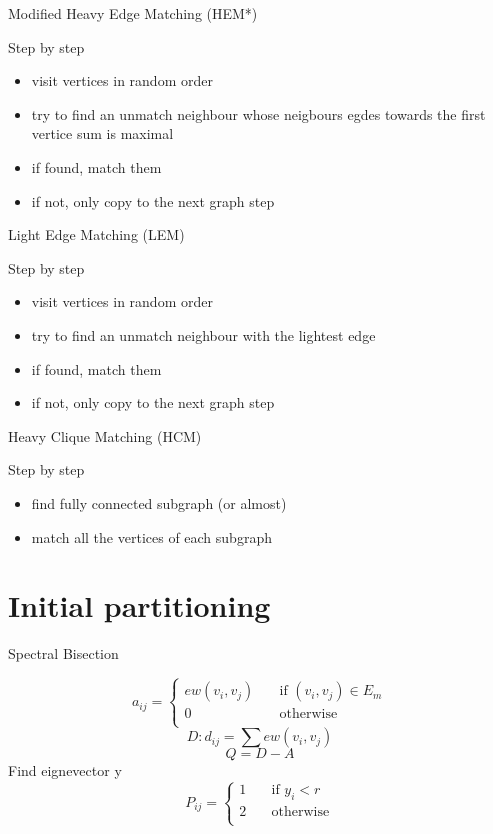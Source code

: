 \documentclass{beamer}
\begin{document}
\begin{frame}{Modified Heavy Edge Matching (HEM*)}
	\begin{block}{Step by step}
		 \begin{itemize}
			\item visit vertices in random order
			\item try to find an unmatch neighbour whose neigbours egdes towards the first vertice sum is maximal
			\item if found, match them
			\item if not, only copy to the next graph step
		 \end{itemize}
	\end{block}
\end{frame}


\begin{frame}{Light Edge Matching (LEM)}
	\begin{block}{Step by step}
		 \begin{itemize}
			\item visit vertices in random order
			\item try to find an unmatch neighbour with the lightest edge
			\item if found, match them
			\item if not, only copy to the next graph step
		 \end{itemize}
	\end{block}
\end{frame}


\begin{frame}{Heavy Clique Matching (HCM)}
	\begin{block}{Step by step}
		 \begin{itemize}
			\item find fully connected subgraph (or almost)
			\item match all the vertices of each subgraph
		 \end{itemize}
	\end{block}
\end{frame}

\section{Initial partitioning}

\begin{frame}{Spectral Bisection}

 \[a_{ij} =
  \begin{cases}
    ew(v_{i},v_{j})     & \quad \text{if } (v_{i},v_{j})  \in E_{m}\\
    0 & \quad \text{otherwise}\\
  \end{cases}
\]
 \[ D: d_{ij} = \sum ew(v_{i},v_{j}) \]
 \[ Q = D-A \]
 Find eignevector y
  \[ P_{ij} =
  \begin{cases}
   1    & \quad \text{if } y_{i} < r \\
 2 & \quad \text{otherwise}\\
  \end{cases}
\]
\end{frame}
\end{document}
